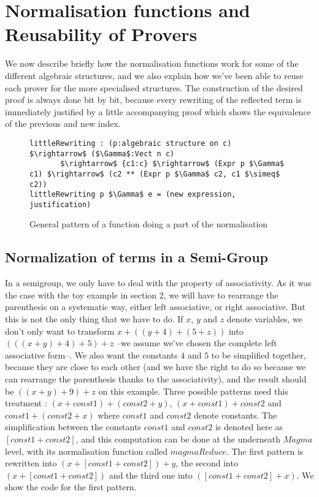 \section{Normalisation functions and Reusability of Provers}

\label{sect:reuse}

We now describe briefly how the normalisation functions work for some of the different algebraic structures, and we also explain how we've been able to reuse each prover for the more specialised structures. The construction of the desired proof is always done bit by bit, because every rewriting of the reflected term is immediately justified by a little accompanying proof which shows the equivalence of the previous and new index.
\begin{figure}[H]
\figrule
\begin{center}
\begin{lstlisting}
littleRewriting : (p:algebraic structure on c) $\rightarrow$ ($\Gamma$:Vect n c) 
       $\rightarrow$ {c1:c} $\rightarrow$ (Expr p $\Gamma$ c1) $\rightarrow$ (c2 ** (Expr p $\Gamma$ c2, c1 $\simeq$ c2))
littleRewriting p $\Gamma$ e = (new expression, justification)
\end{lstlisting}
\end{center}
\caption{General pattern of a function doing a part of the normalisation}
\label{littleRewriting}
\figrule
\end{figure}

	\subsection {Normalization of terms in a Semi-Group}
In a semigroup, we only have to deal with the property of associativity. As it was the case with the toy example in section 2, we will have to rearrange the parenthesis on a systematic way, either left associative, or right associative. But this is not the only thing that we have to do. If $x$, $y$ and $z$ denote variables, we don't only want to transform $x+((y+4)+(5+z))$ into $(((x+y)+4)+5)+z$ --we assume we've chosen the complete left associative form--. We also want the constants $4$ and $5$ to be simplified together, because they are close to each other (and we have the right to do so because we can rearrange the parenthesis thanks to the associativity), and the result should be $((x+y)+9)+z$ on this example. Three possible patterns need this treatment : $(x+const1)+(const2+y)$, $(x + const1) + const2$  and $const1 + (const2 + x)$ where $const1$ and $const2$ denote constants. The simplification between the constants $const1$ and $const2$ is denoted here as $[const1+const2]$, and this computation can be done at the underneath $Magma$ level, with its normalisation function called $magmaReduce$.
The first pattern is rewritten into $(x + [const1+const2]) + y$, the second into $(x + [const1+const2])$ and the third one into $([const1 + const2] + x)$.
We show the code for the first pattern.

